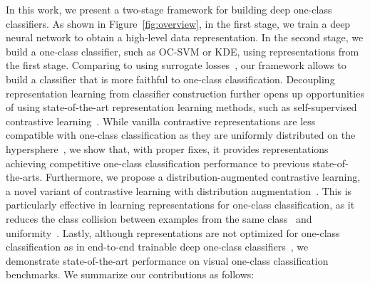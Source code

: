 \documentclass{article} \usepackage{iclr2021_conference,times}
\begin{document}
In this work, we present a two-stage framework for building deep one-class classifiers. As shown in Figure~\ref{fig:overview}, in the first stage, we train a deep neural network to obtain a high-level data representation. In the second stage, we build a one-class classifier, such as OC-SVM or KDE, using representations from the first stage.
Comparing to using surrogate losses~\citep{golan2018deep,hendrycks2019using}, our framework allows to build a classifier that is more faithful to one-class classification. Decoupling representation learning from classifier construction further opens up opportunities of using state-of-the-art representation learning methods, such as self-supervised contrastive learning~\citep{chen2020simple}.
While vanilla contrastive representations are less compatible with one-class classification as they are uniformly distributed on the hypersphere~\citep{wang2020understanding}, we show that, with proper fixes, it provides representations achieving competitive one-class classification performance to previous state-of-the-arts. 
Furthermore, we propose a distribution-augmented contrastive learning, a novel variant of contrastive learning with distribution augmentation~\citep{icml2020_6095}. 
This is particularly effective in learning representations for one-class classification, as it reduces the class collision between examples from the same class~\citep{saunshi2019theoretical} and uniformity~\citep{wang2020understanding}. 
Lastly, although representations are not optimized for one-class classification as in end-to-end trainable deep one-class classifiers~\citep{ruff2018deep}, we demonstrate state-of-the-art performance on visual one-class classification benchmarks.
We summarize our contributions as follows:
\vspace{-0.15in}
\end{document}
